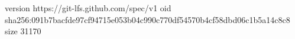 version https://git-lfs.github.com/spec/v1
oid sha256:091b7bacfde97cf94715e053b04c990c770df54570b4cf58dbd06c1b5a14c8c8
size 31170
